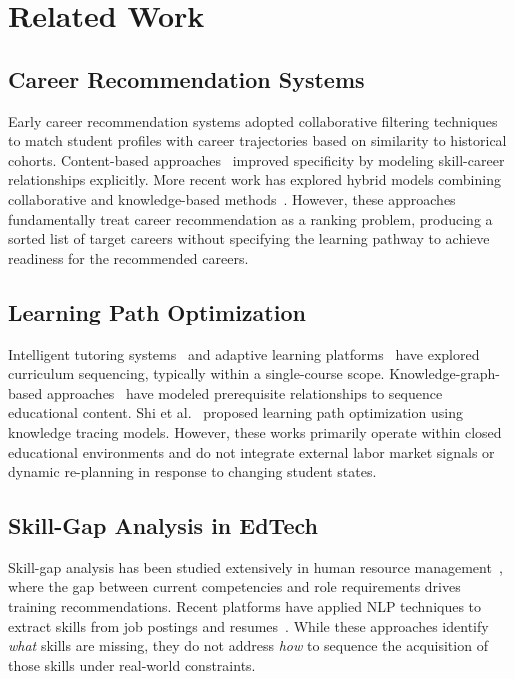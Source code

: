 \documentclass[conference]{IEEEtran}
\begin{document}
\section{Related Work}

\subsection{Career Recommendation Systems}

Early career recommendation systems adopted collaborative filtering techniques~\cite{b1} to match student profiles with career trajectories based on similarity to historical cohorts. Content-based approaches~\cite{b4} improved specificity by modeling skill-career relationships explicitly. More recent work has explored hybrid models combining collaborative and knowledge-based methods~\cite{b3}. However, these approaches fundamentally treat career recommendation as a ranking problem, producing a sorted list of target careers without specifying the learning pathway to achieve readiness for the recommended careers.

\subsection{Learning Path Optimization}

Intelligent tutoring systems~\cite{b5} and adaptive learning platforms~\cite{b6} have explored curriculum sequencing, typically within a single-course scope. Knowledge-graph-based approaches~\cite{b7} have modeled prerequisite relationships to sequence educational content. Shi et al.~\cite{b8} proposed learning path optimization using knowledge tracing models. However, these works primarily operate within closed educational environments and do not integrate external labor market signals or dynamic re-planning in response to changing student states.

\subsection{Skill-Gap Analysis in EdTech}

Skill-gap analysis has been studied extensively in human resource management~\cite{b9}, where the gap between current competencies and role requirements drives training recommendations. Recent platforms have applied NLP techniques to extract skills from job postings and resumes~\cite{b10}. While these approaches identify \emph{what} skills are missing, they do not address \emph{how} to sequence the acquisition of those skills under real-world constraints.
\end{document}
